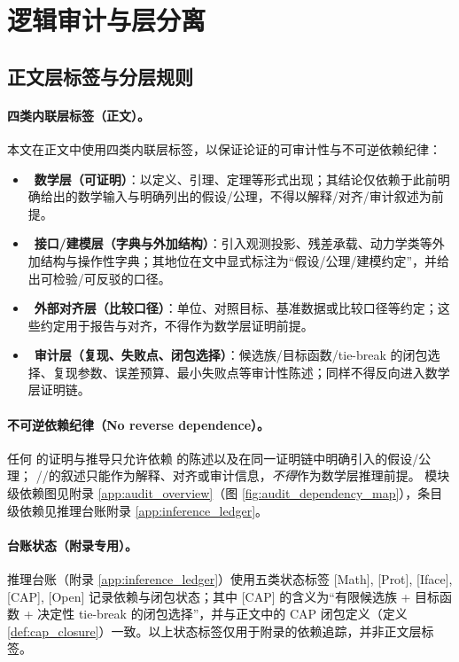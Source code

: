 \setcounter{section}{-1}
\section{逻辑审计与层分离}

\subsection{正文层标签与分层规则}

\paragraph{四类内联层标签（正文）。}
本文在正文中使用四类内联层标签，以保证论证的可审计性与不可逆依赖纪律：
\begin{itemize}
  \item \MathTag\ \textbf{数学层（可证明）}：以定义、引理、定理等形式出现；其结论仅依赖于此前明确给出的数学输入与明确列出的假设/公理，不得以解释/对齐/审计叙述为前提。
  \item \InterfaceTag\ \textbf{接口/建模层（字典与外加结构）}：引入观测投影、残差承载、动力学类等外加结构与操作性字典；其地位在文中显式标注为“假设/公理/建模约定”，并给出可检验/可反驳的口径。
  \item \MatchTag\ \textbf{外部对齐层（比较口径）}：单位、对照目标、基准数据或比较口径等约定；这些约定用于报告与对齐，不得作为数学层证明前提。
  \item \AuditTag\ \textbf{审计层（复现、失败点、闭包选择）}：候选族/目标函数/tie-break 的闭包选择、复现参数、误差预算、最小失败点等审计性陈述；同样不得反向进入数学层证明链。
\end{itemize}

\paragraph{不可逆依赖纪律（No reverse dependence）。}
\AuditTag 任何 \MathTag 的证明与推导只允许依赖 \MathTag 的陈述以及在同一证明链中明确引入的假设/公理；
\InterfaceTag/\MatchTag/\AuditTag 的叙述只能作为解释、对齐或审计信息，\emph{不得}作为数学层推理前提。
模块级依赖图见附录 \ref{app:audit_overview}（图 \ref{fig:audit_dependency_map}），条目级依赖见推理台账附录 \ref{app:inference_ledger}。

\paragraph{台账状态（附录专用）。}
\AuditTag 推理台账（附录 \ref{app:inference_ledger}）使用五类状态标签 \textsf{[Math]}, \textsf{[Prot]}, \textsf{[Iface]}, \textsf{[CAP]}, \textsf{[Open]} 记录依赖与闭包状态；其中 \textsf{[CAP]} 的含义为“有限候选族 + 目标函数 + 决定性 tie-break 的闭包选择”，并与正文中的 CAP 闭包定义（定义 \ref{def:cap_closure}）一致。以上状态标签仅用于附录的依赖追踪，并非正文层标签。

